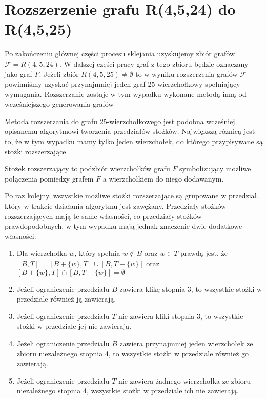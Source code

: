 \section{Rozszerzenie grafu R(4,5,24) do R(4,5,25)}

Po zakończeniu głównej części procesu sklejania uzyskujemy zbiór grafów $\mathcal{F} = R(4,5,24)$. W dalszej części pracy graf z tego zbioru będzie oznaczany jako graf $F$. Jeżeli zbiór $R(4,5,25) \neq \emptyset$ to w wyniku rozszerzenia grafów $\mathcal{F}$ powinniśmy uzyskać przynajmniej jeden graf 25 wierzchołkowy spełniający wymagania. 
Rozszerzanie zostaje w tym wypadku wykonane metodą inną od wcześniejszego generowania grafów

Metoda rozszerzania do grafu 25-wierzchołkowego jest podobna wcześniej opisanemu algorytmowi tworzenia przedziałów stożków. Największą róznicą jest to, że w tym wypadku mamy tylko jeden wierzchołek, do którego przypisywane są stożki rozszerzające.
\begin{definition}
  Stożek rozszerzający to podzbiór wierzchołków grafu $F$ symbolizujący możliwe połączenia pomiędzy grafem $F$ a wierzchołkiem do niego dodawanym.
\end{definition}

Po raz kolejny, wszystkie możliwe stożki rozszerzające są grupowane w przedział, który w trakcie działania algorytmu jest zawężany. Przedziały stożków rozszerzających mają te same własności, co przedziały stożków prawdopodobnych, w tym wypadku mają jednak znaczenie dwie dodatkowe własności:

\begin{enumerate}

\item Dla wierzchołka $w$, który spełnia $w \notin B$ oraz $w\in T$ prawdą jest, że $[B, T] = [B + \{ w\}, T] \cup [B , T - \{ w\}]$ oraz $[B +\{ w\}, T] \cap [B , T - \{ w\}] = \emptyset$

\item Jeżeli ograniczenie przedziału $B$ zawiera klikę stopnia 3, to wszystkie stożki w przedziale również ją zawierają. 

\item Jeżeli ograniczenie przedziału $T$ nie zawiera kliki stopnia 3, to wszystkie stożki w przedziale jej nie zawierają.

																													  
				 
\item Jeżeli ograniczenie przedziału $B$ zawiera przynajmniej jeden wierzchołek ze zbioru niezależnego stopnia 4, to wszystkie stożki w przedziale również go zawierają. 

\item Jeżeli ograniczenie przedziału $T$ nie zawiera żadnego wierzchołka ze zbioru niezależnego stopnia 4, wszystkie stożki w przedziale ich nie zawierają. 

\end {enumerate}

